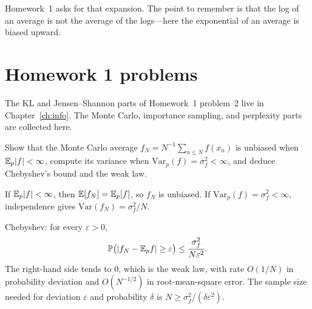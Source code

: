 Homework~1 asks for that expansion. The point to remember is that the log of an average is not the average of the logs---here the exponential of an average is biased upward.

\section{Homework 1 problems}

The KL and Jensen--Shannon parts of Homework~1 problem~2 live in Chapter~\ref{ch:info}. The Monte Carlo, importance sampling, and perplexity parts are collected here.

\begin{hwqbox}
Show that the Monte Carlo average $f_N=N^{-1}\sum_{n\le N}f(x_n)$ is unbiased when $\mathbb{E}_p|f|<\infty$, compute its variance when $\mathrm{Var}_p(f)=\sigma_f^2<\infty$, and deduce Chebyshev's bound and the weak law.
\end{hwqbox}
\begin{hwsolbox}
If $\mathbb{E}_p|f|<\infty$, then $\mathbb{E}[f_N]=\mathbb{E}_p[f]$, so $f_N$ is unbiased. If $\mathrm{Var}_p(f)=\sigma_f^2<\infty$, independence gives $\mathrm{Var}(f_N)=\sigma_f^2/N$.

Chebyshev: for every $\varepsilon>0$,
\[
\mathbb P\big(|f_N-\mathbb{E}_p f|\ge\varepsilon\big)\le\frac{\sigma_f^2}{N\varepsilon^2}.
\]
The right-hand side tends to $0$, which is the weak law, with rate $O(1/N)$ in probability deviation and $O(N^{-1/2})$ in root-mean-square error. The sample size needed for deviation $\varepsilon$ and probability $\delta$ is $N\ge\sigma_f^2/(\delta\varepsilon^2)$.
\end{hwsolbox}

